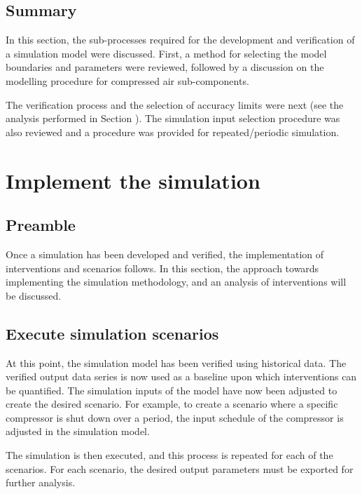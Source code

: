 	\subsection{Summary}	
In this section, the sub-processes required for the development and verification of a simulation model were discussed. First, a method for selecting the model boundaries and parameters were reviewed, followed by a discussion on the modelling procedure for compressed air sub-components. 
\par 
The verification process and the selection of accuracy limits were next (see the analysis performed in Section ). The simulation input selection procedure was also reviewed and a procedure was provided for repeated/periodic simulation.

\section{Implement the simulation}
	\subsection{Preamble}
		Once a simulation has been developed and verified, the implementation of interventions and scenarios follows. In this section, the approach towards implementing the simulation methodology, and an analysis of interventions will be discussed.
	\subsection{Execute simulation scenarios}
		At this point, the simulation model has been verified using historical data. The verified output data series is now used as a baseline upon which interventions can be quantified. The simulation inputs of the model have now been adjusted to create the desired scenario. For example, to create a scenario where a specific compressor is shut down over a period, the input schedule of the compressor is adjusted in the simulation model.
		\par
		The simulation is then executed, and this process is repeated for each of the scenarios. For each scenario, the desired output parameters must be exported for further analysis.

